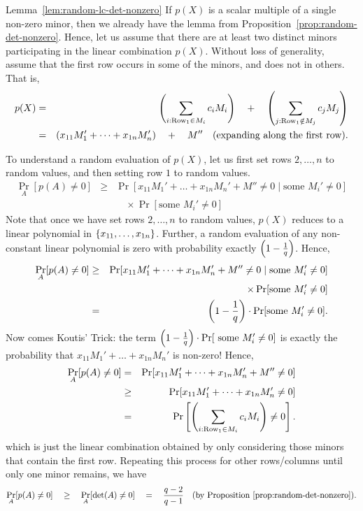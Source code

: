 \begin{proofof}{Lemma~\ref{lem:random-lc-det-nonzero}}
  If $p(X)$ is a scalar multiple of a single non-zero minor, then we
  already have the lemma from
  Proposition~\ref{prop:random-det-nonzero}. Hence, let us assume that
  there are at least two distinct minors participating in the linear
  combination $p(X)$. Without loss of generality, assume that the
  first row occurs in some of the minors, and does not in others. That is, 
  \begin{eqnarray*}
    p(X) &=& \left(\sum_{i:\text{Row}_1\in M_i} c_i M_i\right) \quad+ \quad \left(\sum_{j:\text{Row}_1\notin M_j} c_j M_j\right)\\
     & = & \left(x_{11} M_1' + \dots + x_{1n} M_{n}'\right) \quad+\quad M'' \quad\text{(expanding along the first row)}.
  \end{eqnarray*}
  
  To understand a random evaluation of $p(X)$, let us first set rows $2, \dots, n$ to random values, and
  then setting row $1$ to random values. 
  \begin{eqnarray*}
    \Pr_{A}[p(A)\neq 0] & \geq & \Pr[x_{11} M_1' + \dots + x_{1n} M_n' + M'' \neq 0 \;|\; \text{some }M_{i}'\neq 0]\\
    & & \quad \times \Pr[\text{some }M_i' \neq 0]
  \end{eqnarray*}
  Note that once we have set rows $2,\dots, n$ to random values, $p(X)$ reduces to a linear polynomial in $\left\{x_{11},\dots, x_{1n}\right\}$. Further, a random evaluation of any non-constant linear polynomial is zero with probability exactly $\left(1 -\frac{1}{q}\right)$. Hence, 
  \begin{eqnarray*}
\Pr_{A}[p(A)\neq 0] & \geq & \Pr[x_{11} M_1' + \dots + x_{1n} M_n' + M'' \neq 0 \;|\; \text{some }M_{i}'\neq 0]\\
 & & \quad \times \Pr[\text{some }M_i' \neq 0]\\
    & = & \left(1 - \frac{1}{q}\right)\cdot \Pr[\text{some }M_i' \neq 0].
  \end{eqnarray*}
  Now comes  Koutis' Trick: the term $\left(1 -
    \frac{1}{q}\right) \cdot \Pr[\text{ some }M_i' \neq 0]$ is exactly the
  probability that $x_{11}M_1' + \dots + x_{1n}M_n'$ is non-zero! Hence,
\begin{eqnarray*}
\Pr_{A}[p(A) \neq 0] & = & \Pr[ x_{11}M_1' + \dots + x_{1n} M_n' + M''\neq 0]\\
 & \geq & \Pr[ x_{11}M_1' + \dots + x_{1n} M_n'\neq 0]\\
 & = & \Pr\left[\left(\sum_{i:\text{Row}_1\in M_i} c_i M_i\right) \neq 0\right].
\end{eqnarray*}
which is just the linear combination obtained by only considering
those minors that contain the first row. Repeating this process for other
rows/columns until only  one minor remains, we have
$$
\Pr_{A}[p(A) \neq 0] \quad \geq \quad \Pr_{A}[\det(A) \neq 0] \quad = \quad
\frac{q-2}{q-1}\quad(\text{by Proposition~\ref{prop:random-det-nonzero}}).
$$
\end{proofof}


